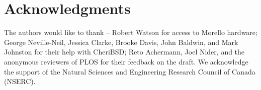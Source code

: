 \section*{Acknowledgments}
The authors would like to thank --  Robert Watson for access to Morello hardware; George Neville-Neil, Jessica Clarke, Brooke Davis, John Baldwin, and Mark Johnston for their help with CheriBSD; Reto Achermann, Joel Nider, and the anonymous reviewers of PLOS for their feedback on the draft. We acknowledge the support of the Natural Sciences and Engineering Research Council of Canada (NSERC).


